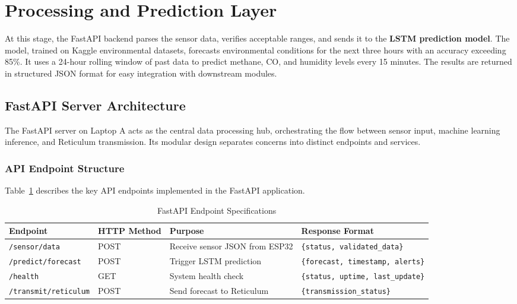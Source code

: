 \section{Processing and Prediction Layer}

At this stage, the FastAPI backend parses the sensor data, verifies acceptable ranges, and sends it to the \textbf{LSTM prediction model}. The model, trained on Kaggle environmental datasets, forecasts environmental conditions for the next three hours with an accuracy exceeding 85\%. It uses a 24-hour rolling window of past data to predict methane, CO, and humidity levels every 15 minutes. The results are returned in structured JSON format for easy integration with downstream modules.

\subsection{FastAPI Server Architecture}

The FastAPI server on Laptop A acts as the central data processing hub, orchestrating the flow between sensor input, machine learning inference, and Reticulum transmission. Its modular design separates concerns into distinct endpoints and services.

\subsubsection{API Endpoint Structure}

Table~\ref{tab:api_endpoints} describes the key API endpoints implemented in the FastAPI application.

\begin{table}[H]
\centering
\caption{FastAPI Endpoint Specifications}
\label{tab:api_endpoints}
\begin{tabular}{|p{3.8cm}|p{2.5cm}|p{4cm}|p{4cm}|}
\hline
\textbf{Endpoint} & \textbf{HTTP Method} & \textbf{Purpose} & \textbf{Response Format} \\
\hline
\texttt{/sensor/data} & POST & Receive sensor JSON from ESP32 & \texttt{\{status, validated\_data\}} \\
\hline
\texttt{/predict/forecast} & POST & Trigger LSTM prediction & \texttt{\{forecast, timestamp, alerts\}} \\
\hline
\texttt{/health} & GET & System health check & \texttt{\{status, uptime, last\_update\}} \\
\hline
\texttt{/transmit/reticulum} & POST & Send forecast to Reticulum & \texttt{\{transmission\_status\}} \\
\hline
\end{tabular}
\end{table}

